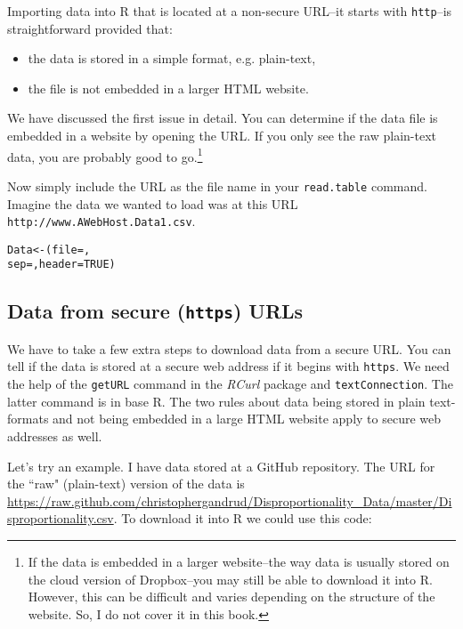 Importing data into R that is located at a non-secure URL--it starts with {\tt{http}}--is straightforward provided that:

\begin{itemize}
    \item the data is stored in a simple format, e.g. plain-text,
    \item the file is not embedded in a larger HTML website.
\end{itemize}

We have discussed the first issue in detail. You can determine if the data file is embedded in a website by opening the URL. If you only see the raw plain-text data, you are probably good to go.\footnote{If the data is embedded in a larger website--the way data is usually stored on the cloud version of Dropbox--you may still be able to download it into R. However, this can be difficult and varies depending on the structure of the website. So, I do not cover it in this book.}

Now simply include the URL as the file name in your \texttt{read.table} command. Imagine the data we wanted to load was at this URL \texttt{http://www.AWebHost.Data1.csv}.

\begin{knitrout}
\color{fgcolor}\begin{kframe}
\begin{alltt}
Data <- (file = , 
                    sep = , header = TRUE)
\end{alltt}
\end{kframe}
\end{knitrout}


\subsection{Data from secure ({\tt{https}}) URLs}

We have to take a few extra steps to download data from a secure URL. You can tell if the data is stored at a secure web address if it begins with \texttt{https}. We need the help of the \texttt{getURL} command in the {\emph{RCurl}} package\cite[]{RCurl} and \texttt{textConnection}. The latter command is in base R. The two rules about data being stored in plain text-formats and not being embedded in a large HTML website apply to secure web addresses as well.

Let's try an example. I have data stored at a GitHub repository. The URL for the ``raw" (plain-text) version of the data is \url{https://raw.github.com/christophergandrud/Disproportionality_Data/master/Disproportionality.csv}. 
To download it into R we could use this code:





